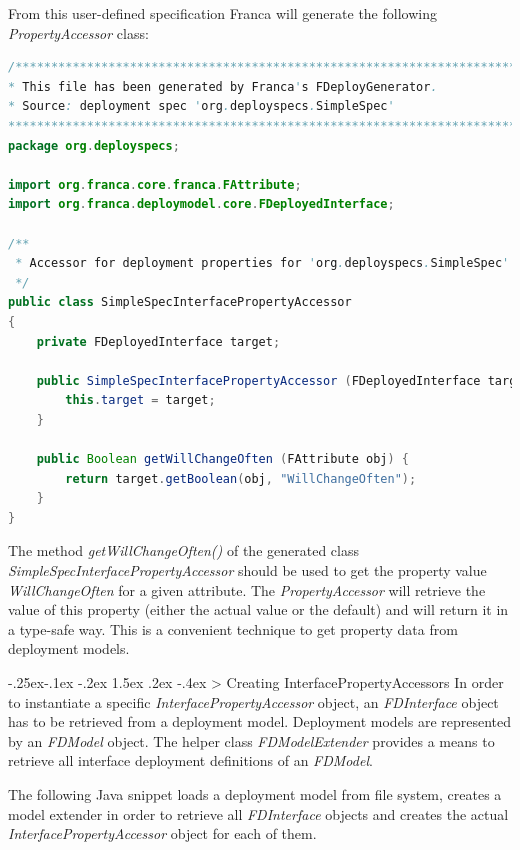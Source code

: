 \documentclass[a4paper,10pt]{scrreprt}
\makeatletter
\renewcommand\subsection{\medskip\@startsection{subsection}{2}{\z@}%
  {-.25ex\@plus -.1ex \@minus -.2ex}%
  {1.5ex \@plus .2ex \@minus -.4ex}%
  {\ifnum \scr@compatibility>\@nameuse{scr@v@2.96}\relax
    \setlength{\parfillskip}{\z@ plus 1fil}\fi
    \raggedsection\normalfont\sectfont\nobreak\size@subsection
  }%
}
\makeatother
\begin{document}
From this user-defined specification Franca will generate the following
\textit{PropertyAccessor} class:


\begin{lstlisting}[language=Java]
/*******************************************************************************
* This file has been generated by Franca's FDeployGenerator.
* Source: deployment spec 'org.deployspecs.SimpleSpec'
*******************************************************************************/
package org.deployspecs;

import org.franca.core.franca.FAttribute;
import org.franca.deploymodel.core.FDeployedInterface;

/**
 * Accessor for deployment properties for 'org.deployspecs.SimpleSpec' specification
 */		
public class SimpleSpecInterfacePropertyAccessor
{
	private FDeployedInterface target;

	public SimpleSpecInterfacePropertyAccessor (FDeployedInterface target) {
		this.target = target;
	}
	
	public Boolean getWillChangeOften (FAttribute obj) {
		return target.getBoolean(obj, "WillChangeOften");
	}
}
\end{lstlisting}

The method \textit{getWillChangeOften()} of the generated class \textit{SimpleSpecInterfacePropertyAccessor}
should be used to get the property value \textit{WillChangeOften} for a given attribute.
The \textit{PropertyAccessor} will retrieve the value of this property (either the actual value
or the default) and will return it in a type-safe way. This is a convenient technique
to get property data from deployment models.

\subsection{Creating InterfacePropertyAccessors}
\label{DeploymentModels_DeploymentAccessSupport_CreatingPropertyAccessor}
In order to instantiate a specific \textit{InterfacePropertyAccessor} object, 
an \textit{FDInterface} object has to be retrieved from a deployment model. 
Deployment models are represented by an \textit{FDModel} object.
The helper class \textit{FDModelExtender} provides a means to retrieve all 
interface deployment definitions of an \textit{FDModel}.

The following Java snippet loads a deployment model from file system,
creates a model extender in order to retrieve all \textit{FDInterface} objects
and creates the actual \textit{InterfacePropertyAccessor} object for each of them.
\end{document}
